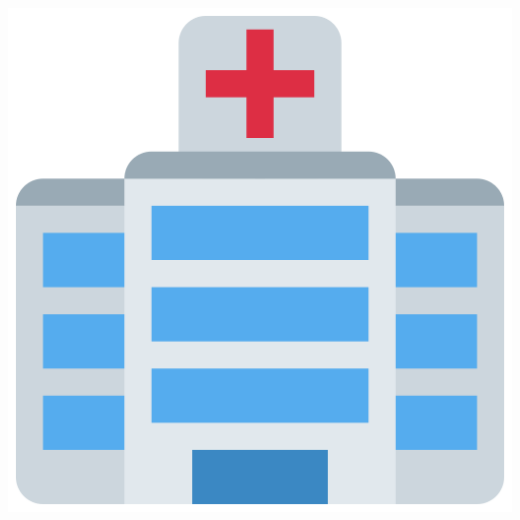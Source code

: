 \begin{frame}
    \hspace{2cm}
    \includegraphics[scale=0.1]{Bin/game_avatars/hospital.png}


\end{frame}
